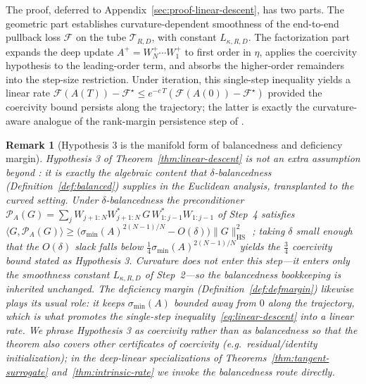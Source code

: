 \documentclass[letterpaper]{article}
\newtheorem{remark}[theorem]{Remark}
\begin{document}
The proof, deferred to Appendix~\ref{sec:proof-linear-descent}, has two
parts. The geometric part establishes curvature-dependent smoothness of
the end-to-end pullback loss $\mathcal F$ on the tube
$\mathcal T_{R,D}$, with constant $L_{\kappa, R, D}$. The factorization
part expands the deep update $A^+ = W_N^+ \cdots W_1^+$ to first order in
$\eta$, applies the coercivity hypothesis to the leading-order term, and
absorbs the higher-order remainders into the step-size restriction. Under
iteration, this single-step inequality yields a linear rate
$\mathcal F(A(T)) - \mathcal F^\star \le e^{-c\, T}(\mathcal F(A(0)) -
\mathcal F^\star)$ provided the coercivity bound persists along the
trajectory; the latter is exactly the curvature-aware analogue of the
rank-margin persistence step of \cite{arora2018convergence}.
\begin{remark}[Hypothesis 3 is the manifold form of balancedness and deficiency margin]
\label{rem:coercivity-balanced}
Hypothesis 3 of Theorem~\ref{thm:linear-descent} is not an extra assumption
beyond \cite{arora2018convergence}: it is exactly the algebraic content that
$\delta$-balancedness (Definition~\ref{def:balanced}) supplies in the
Euclidean analysis, transplanted to the curved setting. Under
$\delta$-balancedness the preconditioner
$\mathcal P_A(G)=\sum_j W_{j+1:N}W_{j+1:N}^*\,G\,W_{1:j-1}^*W_{1:j-1}$ of
Step~4 satisfies $\langle G,\mathcal P_A(G)\rangle \ge
\big(\sigma_{\min}(A)^{2(N-1)/N}-O(\delta)\big)\|G\|_{\mathrm{HS}}^2$
\cite{arora2018convergence}; taking $\delta$ small enough that the $O(\delta)$
slack falls below $\tfrac14\sigma_{\min}(A)^{2(N-1)/N}$ yields the $\tfrac34$
coercivity bound stated as Hypothesis 3. Curvature does not enter this
step---it enters only the smoothness constant $L_{\kappa,R,D}$ of Step~2---so
the balancedness bookkeeping is inherited unchanged. The deficiency margin
(Definition~\ref{def:defmargin}) likewise plays its usual role: it keeps
$\sigma_{\min}(A)$ bounded away from $0$ along the trajectory, which is what
promotes the single-step inequality~\eqref{eq:linear-descent} into a linear
rate. We phrase Hypothesis 3 as coercivity rather than as balancedness so that
the theorem also covers other certificates of coercivity (e.g.\
residual/identity initialization); in the deep-linear specializations of
Theorems~\ref{thm:tangent-surrogate} and~\ref{thm:intrinsic-rate} we invoke
the balancedness route directly.
\end{remark}
\end{document}
